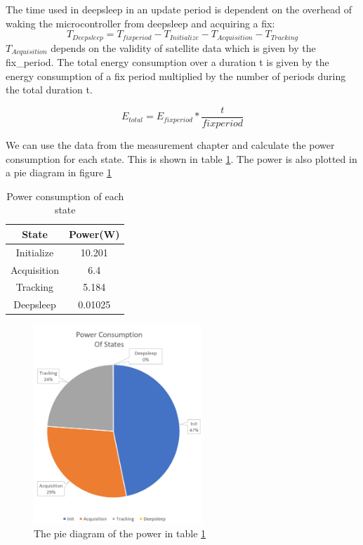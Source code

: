 The time used in deepsleep in an update period is dependent on the overhead of waking the microcontroller from deepsleep and acquiring a fix:
\begin{equation}
T_{Deepsleep} = T_{fixperiod} - T_{Initialize} - T_{Acquisition} - T_{Tracking}
\end{equation}
$T_ {Acquisition}$ depends on the validity of satellite data which is given by the fix\_period. The total energy consumption over a duration t is given by the energy consumption of a fix period multiplied by the number of periods during the total duration t.

\begin{equation}
 E_{total} = E_{fixperiod}* \frac{t}{fixperiod}
\end{equation}
\label{equation: energyequation}

 We can use the data from the measurement chapter and calculate the power consumption for each state. This is shown in table  \ref{Table:data for the energy model}. The power is also plotted in a pie diagram in figure \ref{fig:powerconsumption}
\begin{table}[h!]
\begin{center}
 \begin{tabular}{||c c||} 
 \hline
  State &  Power(W) \\ [0.5ex] 
 \hline\hline
  Initialize & 10.201 \\ 
 \hline
 Acquisition & 6.4 \\
 \hline
 Tracking & 5.184 \\
 \hline
 Deepsleep & 0.01025 \\
 [1ex]
 \hline
\end{tabular}
\end{center}
\caption{Power consumption of each state}
\label{Table:data for the energy model}
\end{table}

\begin{figure}[H]
\centering
\includegraphics[height=7.5cm]{Project_Report/Images/powerconsump.PNG}
\caption{The pie diagram of the power in table \ref{Table:data for the energy model}}
\label{fig:powerconsumption}
\end{figure}

